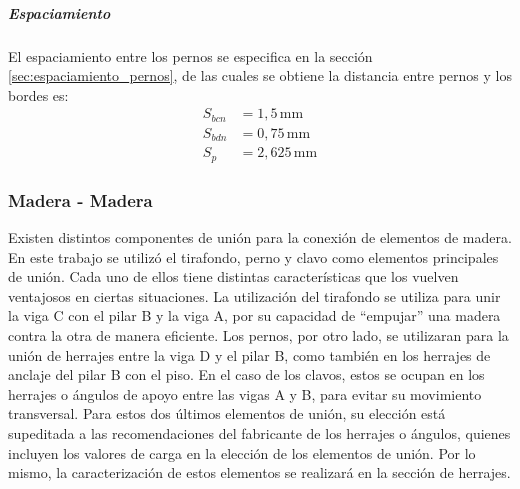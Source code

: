 \subparagraph{Espaciamiento}
El espaciamiento entre los pernos se especifica en la sección \ref{sec:espaciamiento_pernos}, de las cuales se obtiene la distancia entre pernos y los bordes es:
\begin{align*}
	S_{bcn} &= 1,5 \, \text{mm} \\
	S_{bdn} &= 0,75 \, \text{mm} \\
	S_p &= 2,625 \, \text{mm}
\end{align*}


\subsubsection{Madera - Madera}
Existen distintos componentes de unión para la conexión de elementos de madera. En este trabajo se utilizó el tirafondo, perno y clavo como elementos principales de unión.  Cada uno de ellos tiene distintas características que los vuelven ventajosos en ciertas situaciones. La utilización del tirafondo se utiliza para unir la viga C con el pilar B y la viga A, por su capacidad de ``empujar'' una madera contra la otra de manera eficiente. Los pernos, por otro lado, se utilizaran para la unión de herrajes entre la viga D y el pilar B, como también en los herrajes de anclaje del pilar B con el piso. En el caso de los clavos, estos se ocupan en los  herrajes o ángulos de apoyo entre las vigas A y B, para evitar su movimiento transversal. Para estos dos últimos elementos de unión, su elección está supeditada a las recomendaciones del fabricante de los herrajes o ángulos, quienes incluyen los valores de carga en la elección de los elementos de unión. Por lo mismo, la caracterización de estos elementos se realizará en la sección de herrajes.

